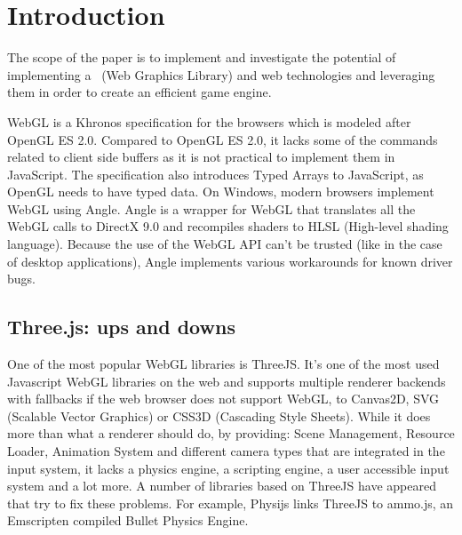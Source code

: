 \chapter{Introduction}
\label{chapter:intro}

The scope of the paper is to implement and investigate the potential of implementing a
\project\ (Web Graphics Library) and web technologies and leveraging them in order to create an efficient game engine.

WebGL is a Khronos specification for the browsers which is modeled after OpenGL ES 2.0. Compared to OpenGL ES 2.0, it lacks some of the commands related to client side buffers as it is not practical to implement them in JavaScript. The specification also introduces Typed Arrays to JavaScript, as OpenGL needs to have typed data. On Windows, modern browsers implement WebGL using Angle. Angle is a wrapper for WebGL that translates all the WebGL calls to DirectX 9.0 and recompiles shaders to HLSL (High-level shading language). Because the use of the WebGL API can't be trusted (like in the case of desktop applications), Angle implements various workarounds for known driver bugs.


\section{Three.js: ups and downs}
\label{sec: ThreeJs}

One of the most popular WebGL libraries is ThreeJS. It’s one of the most used Javascript WebGL libraries on the web and supports multiple renderer backends with fallbacks if the web browser does not support WebGL, to Canvas2D, SVG (Scalable Vector Graphics) or CSS3D (Cascading Style Sheets). 
While it does more than what a renderer should do, by providing: Scene Management,
Resource Loader, Animation System and different camera types that are integrated in the
input system, it lacks a physics engine, a scripting engine, a user accessible input system and a lot more.
A number of libraries based on ThreeJS have appeared that try to fix these problems. For example, Physijs links ThreeJS to ammo.js, an Emscripten compiled Bullet Physics Engine.


